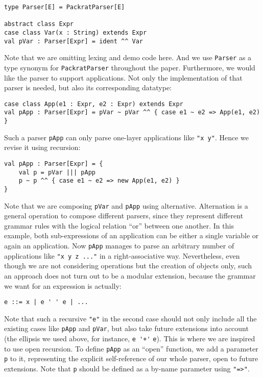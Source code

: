 \begin{lstlisting}
type Parser[E] = PackratParser[E]

abstract class Expr
case class Var(x : String) extends Expr
val pVar : Parser[Expr] = ident ^^ Var
\end{lstlisting}
Note that we are omitting lexing and demo code here. And we use \lstinline{Parser} as a type synonym for \lstinline{PackratParser} throughout the paper. Furthermore, we would like the parser to support applications.
Not only the implementation of that parser is needed, but also its corresponding datatype:
\begin{lstlisting}
case class App(e1 : Expr, e2 : Expr) extends Expr
val pApp : Parser[Expr] = pVar ~ pVar ^^ { case e1 ~ e2 => App(e1, e2) }
\end{lstlisting}
Such a parser \lstinline{pApp} can only parse one-layer applications like \lstinline{"x y"}. Hence we revise it using recursion:
\begin{lstlisting}
val pApp : Parser[Expr] = {
    val p = pVar ||| pApp
    p ~ p ^^ { case e1 ~ e2 => new App(e1, e2) }
}
\end{lstlisting}
Note that we are composing \lstinline{pVar} and \lstinline{pApp} using alternative. Alternation is a general operation to compose different parsers, since they represent different grammar rules with the logical relation ``or'' between one another. In this example, both sub-expressions of an application can be either a single variable or again an application. Now \lstinline{pApp} manages to parse an arbitrary number of applications like \lstinline{"x y z ..."} in a right-associative way.
Nevertheless, even though we are not considering operations but the creation of objects only, such an approach does not turn out to be a modular extension, because the grammar we want for an expression is actually:
\begin{lstlisting}
e ::= x | e ' ' e | ...
\end{lstlisting}
Note that such a recursive \lstinline{"e"} in the second case should not only include all the existing cases like \lstinline{pApp} and \lstinline{pVar}, but also take future extensions into account (the ellipsis we used above, for instance, \lstinline{e '+'} \lstinline{e}). This is where we are inspired to use open recursion. To define \lstinline{pApp} as an ``open'' function, we add a parameter \lstinline{p} to it, representing the explicit self-reference of our whole parser, open to future extensions. Note that \lstinline{p} should be defined as a by-name parameter using \lstinline{"=>"}.
